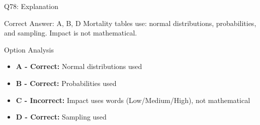 \documentclass{beamer}
\begin{document}
	\begin{frame}{Q78: Explanation}
		\begin{block}{Correct Answer: A, B, D}
			Mortality tables use: normal distributions, probabilities, and sampling. Impact is not mathematical.
		\end{block}
		\begin{block}{Option Analysis}
			\begin{itemize}
				\item \textbf{A - Correct:} Normal distributions used
				\item \textbf{B - Correct:} Probabilities used
				\item \textbf{C - Incorrect:} Impact uses words (Low/Medium/High), not mathematical
				\item \textbf{D - Correct:} Sampling used
			\end{itemize}
		\end{block}
	\end{frame}
	
	
\end{document}
